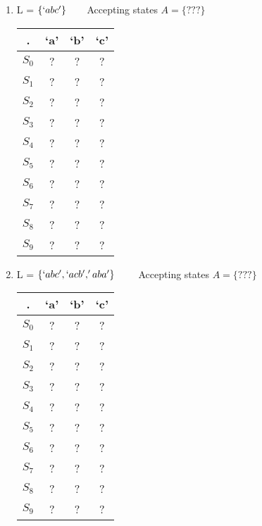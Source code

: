 \documentclass[10pt]{article}
\begin{document}
\begin{enumerate}
\begin{enumerate}
\item L = $\{`abc'\}$~~~~Accepting states $A = \{???\}$
     \begin{center}
      \begin{tabular}{ |c|c|c|c| } 
        \hline
 .  & `a' & `b' & `c' \\\hline \hline
 $S_0$ & ? & ? & ?\\ \hline
 $S_1$ & ? & ? & ? \\ \hline
 $S_2$ & ? & ? & ? \\ \hline
 $S_3$ & ? & ? & ? \\ \hline
 $S_4$ & ? & ? & ? \\ \hline
 $S_5$ & ? & ? & ? \\ \hline
 $S_6$ & ? & ? & ? \\ \hline
 $S_7$ & ? & ? & ? \\ \hline
 $S_8$ & ? & ? & ? \\ \hline
 $S_9$ & ? & ? & ? \\ \hline
\end{tabular}
\end{center}

\newpage
\item L = $\{`abc', `acb','aba'\}$ ~~~~Accepting states $A = \{???\}$
     \begin{center}
      \begin{tabular}{ |c|c|c|c| } 
        \hline
 .  & `a' & `b' & `c' \\\hline \hline
 $S_0$ & ? & ? & ?\\ \hline
 $S_1$ & ? & ? & ? \\ \hline
 $S_2$ & ? & ? & ? \\ \hline
 $S_3$ & ? & ? & ? \\ \hline
 $S_4$ & ? & ? & ? \\ \hline
 $S_5$ & ? & ? & ? \\ \hline
 $S_6$ & ? & ? & ? \\ \hline
 $S_7$ & ? & ? & ? \\ \hline
 $S_8$ & ? & ? & ? \\ \hline
 $S_9$ & ? & ? & ? \\ \hline
\end{tabular}
\end{center}


\end{enumerate}
\end{enumerate}
\end{document}
